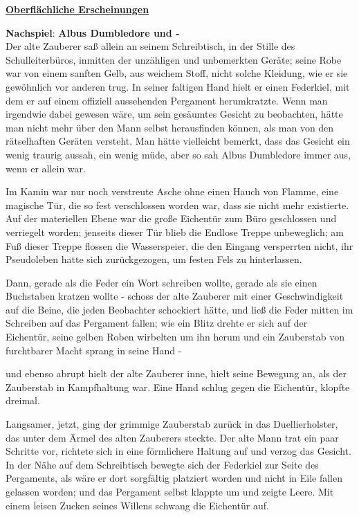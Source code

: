 

\hypertarget{oberfluxe4chliche-erscheinungen}{%

\textbf{\uline{Oberflächliche Erscheinungen}}

\hfill\break \textbf{Nachspiel}: \textbf{Albus Dumbledore und -}\\ Der alte Zauberer saß allein an seinem Schreibtisch, in der Stille des Schulleiterbüros, inmitten der unzähligen und unbemerkten Geräte; seine Robe war von einem sanften Gelb, aus weichem Stoff, nicht solche Kleidung, wie er sie gewöhnlich vor anderen trug. In seiner faltigen Hand hielt er einen Federkiel, mit dem er auf einem offiziell aussehenden Pergament herumkratzte. Wenn man irgendwie dabei gewesen wäre, um sein gesäumtes Gesicht zu beobachten, hätte man nicht mehr über den Mann selbst herausfinden können, als man von den rätselhaften Geräten versteht. Man hätte vielleicht bemerkt, dass das Gesicht ein wenig traurig aussah, ein wenig müde, aber so sah Albus Dumbledore immer aus, wenn er allein war.

Im Kamin war nur noch verstreute Asche ohne einen Hauch von Flamme, eine magische Tür, die so fest verschlossen worden war, dass sie nicht mehr existierte. Auf der materiellen Ebene war die große Eichentür zum Büro geschlossen und verriegelt worden; jenseits dieser Tür blieb die Endlose Treppe unbeweglich; am Fuß dieser Treppe flossen die Wasserspeier, die den Eingang versperrten nicht, ihr Pseudoleben hatte sich zurückgezogen, um festen Fels zu hinterlassen.

Dann, gerade als die Feder ein Wort schreiben wollte, gerade als sie einen Buchstaben kratzen wollte - schoss der alte Zauberer mit einer Geschwindigkeit auf die Beine, die jeden Beobachter schockiert hätte, und ließ die Feder mitten im Schreiben auf das Pergament fallen; wie ein Blitz drehte er sich auf der Eichentür, seine gelben Roben wirbelten um ihn herum und ein Zauberstab von furchtbarer Macht sprang in seine Hand -

und ebenso abrupt hielt der alte Zauberer inne, hielt seine Bewegung an, als der Zauberstab in Kampfhaltung war. Eine Hand schlug gegen die Eichentür, klopfte dreimal.

Langsamer, jetzt, ging der grimmige Zauberstab zurück in das Duellierholster, das unter dem Ärmel des alten Zauberers steckte. Der alte Mann trat ein paar Schritte vor, richtete sich in eine förmlichere Haltung auf und verzog das Gesicht. In der Nähe auf dem Schreibtisch bewegte sich der Federkiel zur Seite des Pergaments, als wäre er dort sorgfältig platziert worden und nicht in Eile fallen gelassen worden; und das Pergament selbst klappte um und zeigte Leere. Mit einem leisen Zucken seines Willens schwang die Eichentür auf.

}
